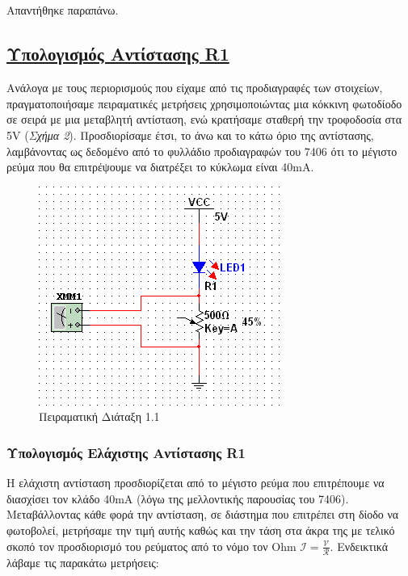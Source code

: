 \documentclass[a4paper,10pt]{article} \usepackage{anysize}
\begin{document}
\subsection{}
Απαντήθηκε παραπάνω.


\pagebreak



\subsection*{\textnormal{\underline{Υπολογισμός Αντίστασης R1}}}
Ανάλογα με τους περιορισμούς που είχαμε από τις προδιαγραφές των στοιχείων,
πραγματοποιήσαμε πειραματικές μετρήσεις χρησιμοποιώντας μια κόκκινη φωτοδίοδο
σε σειρά με μια μεταβλητή αντίσταση, ενώ κρατήσαμε σταθερή την τροφοδοσία στα
5V (\textit{Σχήμα 2}). Προσδιορίσαμε έτσι, το άνω και το κάτω όριο της
αντίστασης, λαμβάνοντας ως δεδομένο από το φυλλάδιο προδιαγραφών του 7406 ότι
το μέγιστο ρεύμα που θα επιτρέψουμε να διατρέξει το κύκλωμα είναι 40mA. 
 
\begin{figure}[H] 
\caption{Πειραματική Διάταξη 1.1} 
\centering
\includegraphics[scale=0.9]{files/peirama1.1.png} 
\end{figure}

\subsubsection*{\textnormal{Υπολογισμός Ελάχιστης Αντίστασης R1}} Η ελάχιστη
αντίσταση προσδιορίζεται από το μέγιστο ρεύμα που επιτρέπουμε να διασχίσει τον
κλάδο 40mA (λόγω της μελλοντικής παρουσίας του 7406). Μεταβάλλοντας κάθε φορά
την αντίσταση, σε διάστημα που επιτρέπει στη δίοδο να φωτοβολεί, μετρήσαμε την
τιμή αυτής καθώς και την τάση στα άκρα της με τελικό σκοπό τον προσδιορισμό
του ρεύματος από το νόμο τον Ohm \begin{math} \mathcal{
I=\frac{V}{R}}\end{math}.  Ενδεικτικά λάβαμε τις παρακάτω μετρήσεις:
\end{document}
